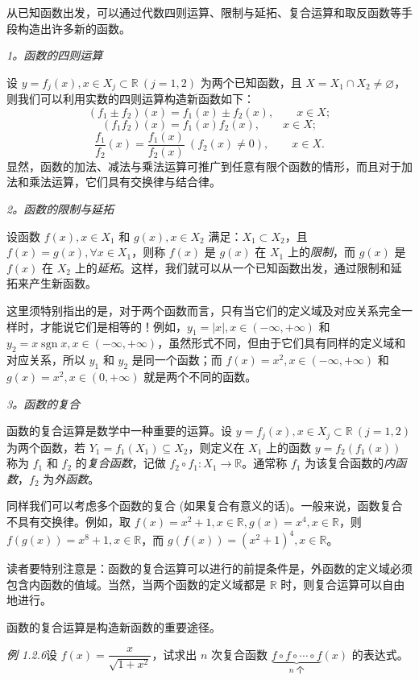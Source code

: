 \documentclass[UTF8,12pt,a4paper,fontset=fandol]{ctexbook}
\begin{document}
从已知函数出发，可以通过代数四则运算、限制与延拓、复合运算和取反函数等手段构造出许多新的函数。

\noindent\emph{1。函数的四则运算}

设 $y=f_j(x),x\in X_j\subset\mathbb{R}\ (j=1,2)$ 为两个已知函数，且 $X=X_1\cap X_2\ne\varnothing$，则我们可以利用实数的四则运算构造新函数如下：
\[
  (f_1\pm f_2)(x)=f_1(x)\pm f_2(x),\qquad x\in X;
\]
\[
  (f_1f_2)(x)=f_1(x)f_2(x),\qquad x\in X;
\]
\[
  \frac{f_1}{f_2}(x)=\frac{f_1(x)}{f_2(x)}\ (f_2(x)\ne0),\qquad x\in X.
\]
显然，函数的加法、减法与乘法运算可推广到任意有限个函数的情形，而且对于加法和乘法运算，它们具有交换律与结合律。

\noindent\emph{2。函数的限制与延拓}

设函数 $f(x),x\in X_1$ 和 $g(x),x\in X_2$ 满足：$X_1\subset X_2$，且 $f(x)=g(x),\forall x\in X_1$，则称 $f(x)$ 是 $g(x)$ 在 $X_1$ 上的\emph{限制}，而 $g(x)$ 是 $f(x)$ 在 $X_2$ 上的\emph{延拓}。这样，我们就可以从一个已知函数出发，通过限制和延拓来产生新函数。

这里须特别指出的是，对于两个函数而言，只有当它们的定义域及对应关系完全一样时，才能说它们是相等的！例如，$y_1=|x|,x\in(-\infty,+\infty)$ 和 $y_2=x\operatorname{sgn}x,x\in(-\infty,+\infty)$，虽然形式不同，但由于它们具有同样的定义域和对应关系，所以 $y_1$ 和 $y_2$ 是同一个函数；而 $f(x)=x^2,x\in(-\infty,+\infty)$ 和 $g(x)=x^2,x\in(0,+\infty)$ 就是两个不同的函数。

\noindent\emph{3。函数的复合}

函数的复合运算是数学中一种重要的运算。设 $y=f_j(x),x\in X_j\subset\mathbb{R}\ (j=1,2)$ 为两个函数，若 $Y_1=f_1(X_1)\subseteq X_2$，则定义在 $X_1$ 上的函数 $y=f_2(f_1(x))$ 称为 $f_1$ 和 $f_2$ 的\emph{复合函数}，记做 $f_2\circ f_1:X_1\to\mathbb{R}$。通常称 $f_1$ 为该复合函数的\emph{内函数}，$f_2$ 为\emph{外函数}。

同样我们可以考虑多个函数的复合 (如果复合有意义的话)。一般来说，函数复合不具有交换律。例如，取 $f(x)=x^2+1,x\in\mathbb{R},g(x)=x^4,x\in\mathbb{R}$，则 $f(g(x))=x^8+1,x\in\mathbb{R}$，而 $g(f(x))=(x^2+1)^4,x\in\mathbb{R}$。

读者要特别注意是：函数的复合运算可以进行的前提条件是，外函数的定义域必须包含内函数的值域。当然，当两个函数的定义域都是 $\mathbb{R}$ 时，则复合运算可以自由地进行。

函数的复合运算是构造新函数的重要途径。

\noindent\emph{例 1.2.6}\quad 设 $f(x)=\dfrac{x}{\sqrt{1+x^2}}$，试求出 $n$ 次复合函数 $\underbrace{f\circ f\circ\cdots\circ f}_{n\text{ 个}}(x)$ 的表达式。
\end{document}
